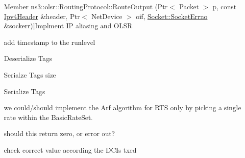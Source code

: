\begin{DoxyRefList}
Member \hyperlink{classns3_1_1olsr_1_1RoutingProtocol_a4b0f79333d7f1f1a68ff057e8f00512d}{ns3\+:\+:olsr\+:\+:Routing\+Protocol\+:\+:Route\+Output} (\hyperlink{classns3_1_1Ptr}{Ptr$<$ Packet $>$} p, const \hyperlink{classns3_1_1Ipv4Header}{Ipv4\+Header} \&header, Ptr$<$ Net\+Device $>$ oif, \hyperlink{classns3_1_1Socket_ada1328c5ae0c28cb2a982caf8f6d6cca}{Socket\+::\+Socket\+Errno} \&sockerr)]Implment IP aliasing and O\+L\+SR  
\item[\label{todo__todo000158}%
\hypertarget{todo__todo000158}{}%
Member \hyperlink{classns3_1_1OmnetDataOutput_aaa7397204fe15cc52f86526acc8c034a}{ns3\+:\+:Omnet\+Data\+Output\+:\+:Output} (\hyperlink{classns3_1_1DataCollector}{Data\+Collector} \&dc)]add timestamp to the runlevel  
\item[\label{todo__todo000147}%
\hypertarget{todo__todo000147}{}%
Member \hyperlink{classns3_1_1Packet_a196f5609e8b04efef405cab130612151}{ns3\+:\+:Packet\+:\+:Deserialize} (uint8\+\_\+t const $\ast$buffer, uint32\+\_\+t size)]Deserialize Tags  
\item[\label{todo__todo000145}%
\hypertarget{todo__todo000145}{}%
Member \hyperlink{classns3_1_1Packet_a7416c3bc8c1a9a86c8ade4dfd1d67d2d}{ns3\+:\+:Packet\+:\+:Get\+Serialized\+Size} (void) const ]Serialze Tags size  
\item[\label{todo__todo000146}%
\hypertarget{todo__todo000146}{}%
Member \hyperlink{classns3_1_1Packet_a939e41b065c6f9f77d3f51373baeaf7e}{ns3\+:\+:Packet\+:\+:Serialize} (uint8\+\_\+t $\ast$buffer, uint32\+\_\+t max\+Size) const ]Serialize Tags  
\item[\label{todo__todo000175}%
\hypertarget{todo__todo000175}{}%
Member \hyperlink{classns3_1_1ParfWifiManager_a693981d57d5f1bdce6a80acf2b0f36a2}{ns3\+:\+:Parf\+Wifi\+Manager\+:\+:Do\+Get\+Rts\+Tx\+Vector} (\hyperlink{structns3_1_1WifiRemoteStation}{Wifi\+Remote\+Station} $\ast$station)]we could/should implement the Arf algorithm for R\+TS only by picking a single rate within the Basic\+Rate\+Set.  
\item[\label{todo__todo000060}%
\hypertarget{todo__todo000060}{}%
Member \hyperlink{classns3_1_1PendingData_a7224d2492c18490d1b75411db218949a}{ns3\+:\+:Pending\+Data\+:\+:Size\+From\+Offset} (uint32\+\_\+t offset)]should this return zero, or error out?  
\item[\label{todo__todo000106}%
\hypertarget{todo__todo000106}{}%
Member \hyperlink{classns3_1_1PfFfMacScheduler_a837f4e59a9df97e0baeda35cf1edbd38}{ns3\+:\+:Pf\+Ff\+Mac\+Scheduler\+:\+:Do\+Sched\+Dl\+Trigger\+Req} (const struct \hyperlink{structns3_1_1FfMacSchedSapProvider_1_1SchedDlTriggerReqParameters}{Ff\+Mac\+Sched\+Sap\+Provider\+::\+Sched\+Dl\+Trigger\+Req\+Parameters} \&params)]check correct value according the D\+C\+Is txed 


\end{DoxyRefList}
